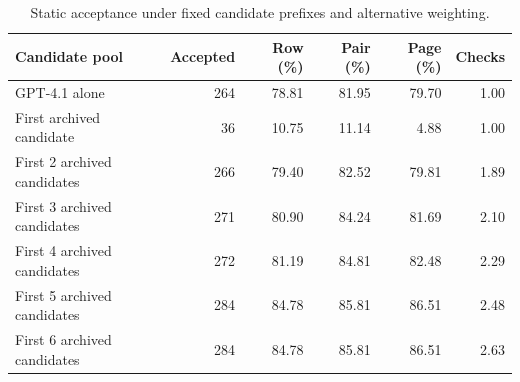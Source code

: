 \begin{table}[H]
\centering\small
\caption{Static acceptance under fixed candidate prefixes and alternative weighting.}
\label{tab:workflowrobustness}
\begin{tabular}{@{}lrrrrr@{}}
\toprule
Candidate pool & Accepted & Row (\%) & Pair (\%) & Page (\%) & Checks\\
\midrule
GPT-4.1 alone & 264 & 78.81 & 81.95 & 79.70 & 1.00\\
First archived candidate & 36 & 10.75 & 11.14 & 4.88 & 1.00\\
First 2 archived candidates & 266 & 79.40 & 82.52 & 79.81 & 1.89\\
First 3 archived candidates & 271 & 80.90 & 84.24 & 81.69 & 2.10\\
First 4 archived candidates & 272 & 81.19 & 84.81 & 82.48 & 2.29\\
First 5 archived candidates & 284 & 84.78 & 85.81 & 86.51 & 2.48\\
First 6 archived candidates & 284 & 84.78 & 85.81 & 86.51 & 2.63\\
\bottomrule
\end{tabular}
\par\vspace{0.3em}{\footnotesize The same 335 rows contain 175 exact description--reference pairs and 127 source pages. Pair and page columns average within each unit before averaging units. Prefixes follow the fixed model priority; checks count sequential static evaluations until acceptance or exhaustion. They do not estimate model calls, latency, or cost.}
\end{table}
